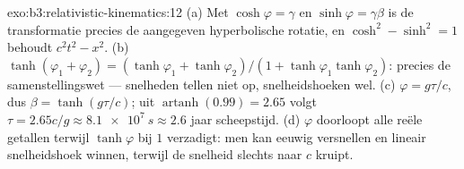 \begin{solution}{exo:b3:relativistic-kinematics:12}
(a) Met $\cosh\varphi = \gamma$ en $\sinh\varphi = \gamma\beta$ is de
transformatie precies de aangegeven hyperbolische rotatie, en
$\cosh^2 - \sinh^2 = 1$ behoudt $c^2t^2 - x^2$. (b)
$\tanh(\varphi_1 + \varphi_2) = (\tanh\varphi_1 + \tanh\varphi_2)/(1 +
\tanh\varphi_1\tanh\varphi_2)$: precies de samenstellingswet ---
snelheden tellen niet op, snelheidshoeken wel. (c) $\varphi = g\tau/c$,
dus $\beta = \tanh(g\tau/c)$; uit $\operatorname{artanh}(0.99) = 2.65$
volgt $\tau = 2.65c/g \approx \qty{8.1e7}{s} \approx 2.6$ jaar
scheepstijd. (d) $\varphi$ doorloopt alle reële getallen terwijl
$\tanh\varphi$ bij $1$ verzadigt: men kan eeuwig versnellen en lineair
snelheidshoek winnen, terwijl de snelheid slechts naar $c$ kruipt.
\end{solution}

